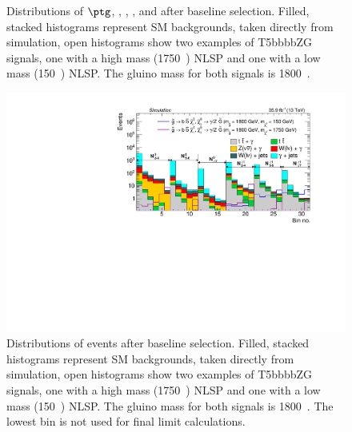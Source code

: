 \begin{figure}[htbp!]
  \captionsetup{width=.9\linewidth}
  \caption[$\ptg$, \ptmiss, \nj, \nb, and \htg after baseline selection]{Distributions of $\ptg$, \ptmiss, \nj, \nb, and \htg after baseline selection.  Filled, stacked histograms represent SM backgrounds, taken directly from simulation, open histograms show two examples of T5bbbbZG signals, one with a high mass (1750~\gev) NLSP and one with a 
  low mass (150~\gev) NLSP.  The gluino mass for both signals is 1800~\gev.}
  \label{fig:baselineKineHist}
\end{figure}

\begin{figure}[h!]
  \centering
  \includegraphics[width=0.98\linewidth]{../Figures/Chap3/event-selection/SMbackgroundVersusSignalRegion.pdf}
  \captionsetup{width=.9\linewidth}
  \caption[MC BG vs signal in search and sidebands]{Distributions of events after baseline selection.  Filled, stacked histograms represent SM backgrounds, taken directly from 
  simulation, open histograms show two examples of T5bbbbZG signals, one with a high mass (1750~\gev) NLSP and one with a 
  low mass (150~\gev) NLSP.  The gluino mass for both signals is 1800~\gev. The lowest \ptmiss bin is not used for 
  final limit calculations.}
  \label{fig:baselineEvtYield}
\end{figure}

